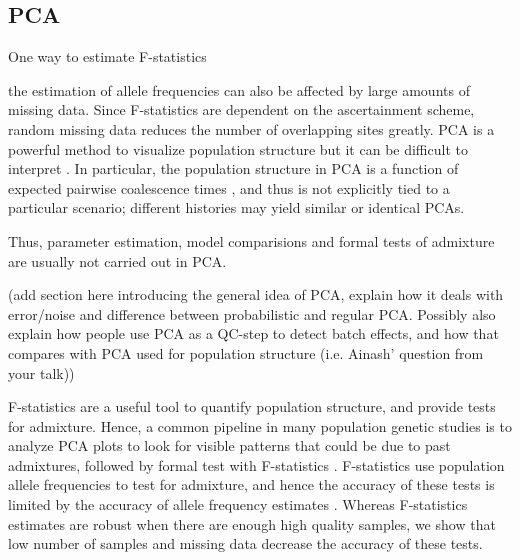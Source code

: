 \documentclass[12pt, letterpaper]{article}
\begin{document}
\subsection{PCA}

One way to estimate F-statistics 

the estimation of allele frequencies can also be affected by large amounts of missing data. Since F-statistics are dependent on the ascertainment scheme, random missing data reduces the number of overlapping sites greatly.
PCA is a powerful method to visualize population structure but it can be difficult to interpret \citep{cavalli-sforza1993, novembre_stephens_2008, degiorgio_rosenberg2013}. In particular, the population structure in PCA is a function of expected pairwise coalescence times \citep{mcvean_genealogical_2009}, and thus is not explicitly tied to a particular scenario; different histories may yield similar or identical PCAs. 

Thus, parameter estimation, model comparisions and formal tests of admixture are usually not carried out in PCA. 

(add section here introducing the general idea of PCA, explain how it deals with error/noise  and difference between probabilistic and regular PCA. Possibly also explain how people use PCA as a QC-step to detect batch effects, and how that compares with PCA used for population structure (i.e. Ainash' question from your talk))

F-statistics are a useful tool to quantify population structure, and provide tests for admixture. Hence, a common pipeline in many population genetic studies is to analyze PCA plots to look for visible patterns that could be due to past admixtures, followed by formal test with F-statistics \cite{lazaridis_ancient_2014,lazaridis_genomic_2016}. F-statistics use population allele frequencies to test for admixture, and hence the accuracy of these tests is limited by the accuracy of allele frequency estimates \cite{peter_admixture_2016}. Whereas F-statistics estimates are robust when there are enough high quality samples, we show that low number of samples and missing data decrease the accuracy of these tests.
\end{document}
